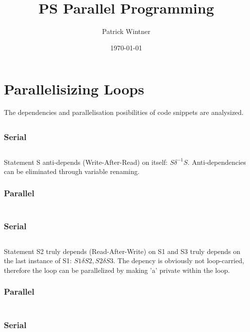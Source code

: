 \documentclass[parskip]{scrartcl}
\title{PS Parallel Programming}
\author{Patrick Wintner}
\date{\today}
\begin{document}
	\maketitle
	
	\section{Parallelisizing Loops}
	The dependencies and parallelisation posibilities of code snippets are analysized.
	\subsection{}
	\subsubsection{Serial}
	\inputminted	[linenos]{c}{ex1/a_ser.c}
	
	Statement S anti-depends (Write-After-Read) on itself: $S\delta^{-1} S$. Anti-dependencies can be eliminated through variable renaming.
	\subsubsection{Parallel}
	\inputminted	[linenos]{c}{ex1/a_par.c}
	\subsection{}
	\subsubsection{Serial}
	\inputminted	[linenos]{c}{ex1/b_ser.c}
	
	Statement S2 truly depends (Read-After-Write) on S1 and S3 truly depends on the last instance of S1: $S1\delta S2, S2\delta S3$. The depency is obviously not loop-carried, therefore the loop can be parallelized by making 'a' private within the loop.
	\subsubsection{Parallel}
	\inputminted	[linenos]{c}{ex1/b_par.c}
	\subsection{}
	\subsubsection{Serial}
	\inputminted	[linenos]{c}{ex1/c_ser.c}
	
\end{document}
